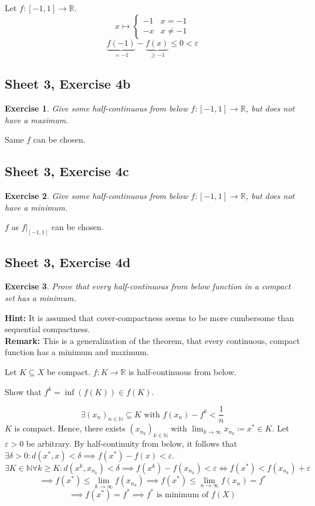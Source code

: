 \documentclass{article}
\newtheorem{ex}{Exercise} %
\begin{document}
Let $f: [-1,1] \to \mathbb R$.
\[
  x \mapsto \begin{cases}
    -1 & x = -1 \\
    -x & x \neq -1
  \end{cases}
\]
\[ \underbrace{f(-1)}_{=-1} - \underbrace{f(x)}_{\geq -1} \leq 0 < \varepsilon \]

\subsection{Sheet 3, Exercise 4b}
\begin{ex}
  Give some half-continuous from below $f: [-1, 1] \to \mathbb R$, but does not have a maximum.
\end{ex}
Same $f$ can be chosen.

\subsection{Sheet 3, Exercise 4c}
\begin{ex}
  Give some half-continuous from below $f: [-1, 1] \to \mathbb R$, but does not have a minimum.
\end{ex}
$f$ as $f|_{[-1,1]}$ can be chosen.

\subsection{Sheet 3, Exercise 4d}
\begin{ex}
  Prove that every half-continuous from below function in a compact set has a minimum.
\end{ex}

\textbf{Hint:} It is assumed that cover-compactness seems to be more cumbersome than sequential compactness. \\
\textbf{Remark:} This is a generalization of the theorem, that every continuous, compact function has a minimum and maximum.

Let $K \subseteq X$ be compact. $f: K \to \mathbb R$ is half-continuous from below.

Show that $f^k = \operatorname{inf}(f(K)) \in f(K)$.

\[ \exists (x_n)_{n\in\mathbb N} \subseteq K \text{ with } f(x_n) - f^k < \frac1n \]
$K$ is compact. Hence, there exists $(x_{n_k})_{k \in \mathbb N}$ with $\lim_{k\to\infty} x_{n_k} \coloneqq x^* \in K$.
Let $\varepsilon > 0$ be arbitrary.
By half-continuity from below, it follows that $\exists \delta > 0: d(x^*, x) < \delta \implies f(x^*) - f(x) < \varepsilon$.
\[ \exists K \in \mathbb N \forall k \geq K: d(x^k, x_{n_k}) < \delta \implies f(x^k) - f(x_{n_k}) < \varepsilon \iff f(x^*) < f(x_{n_k}) + \varepsilon \]
\[ \implies f(x^*) \leq \lim_{k\to\infty} f(x_{n_k}) \implies f(x^*) \leq \lim_{n\to\infty} f(x_n) = f^* \]
\[ \implies f(x^*) = f^* \implies f^* \text{ is minimum of } f(X) \]
\end{document}
